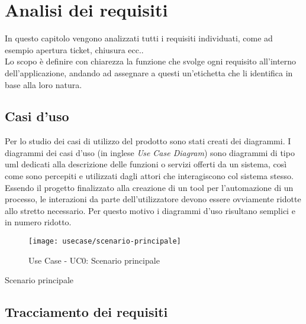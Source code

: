 \chapter{Analisi dei requisiti}
\label{cap:analisi-requisiti}

In questo capitolo vengono analizzati tutti i requisiti individuati, come ad esempio apertura ticket, chiusura ecc..\\
Lo scopo è definire con chiarezza la funzione che svolge ogni requisito all'interno dell'applicazione, andando  ad assegnare a questi un'etichetta che li identifica in base alla  loro natura.

\section{Casi d'uso}

Per lo studio dei casi di utilizzo del prodotto sono stati creati dei diagrammi.
I diagrammi dei casi d'uso (in inglese \emph{Use Case Diagram}) sono diagrammi di tipo \gls{uml} dedicati alla descrizione delle funzioni o servizi offerti da un sistema, così come sono percepiti e utilizzati dagli attori che interagiscono col sistema stesso.
Essendo il progetto finalizzato alla creazione di un tool per l'automazione di un processo, le interazioni da parte dell'utilizzatore devono essere ovviamente ridotte allo stretto necessario. Per questo motivo i diagrammi d'uso risultano semplici e in numero ridotto.

\begin{figure}[!h] 
    \centering 
    \texttt{[image: usecase/scenario-principale]} 
    \caption{Use Case - UC0: Scenario principale}
\end{figure}

\begin{usecase}{0}{Scenario principale}
\label{uc:scenario-principale}
\end{usecase} 

\section{Tracciamento dei requisiti}

